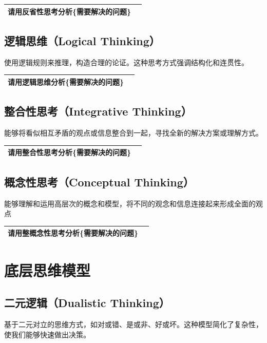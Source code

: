 \documentclass[12pt]{book}
\begin{document}
\begin{tabular}{|p{15cm}|p{3cm}|}
	\hline
请用反省性思考分析\{需要解决的问题\}\\
	\hline
\end{tabular}


\subsection{逻辑思维（Logical Thinking）}
\bigskip
  使用逻辑规则来推理，构造合理的论证。这种思考方式强调结构化和连贯性。

\begin{tabular}{|p{15cm}|p{3cm}|}
	\hline
请用逻辑思维分析\{需要解决的问题\}\\
	\hline
\end{tabular}


\subsection{整合性思考（Integrative Thinking）}
\bigskip
  能够将看似相互矛盾的观点或信息整合到一起，寻找全新的解决方案或理解方式。

\begin{tabular}{|p{15cm}|p{3cm}|}
	\hline
请用整合性思考分析\{需要解决的问题\}\\
	\hline
\end{tabular}



\subsection{概念性思考（Conceptual Thinking）}
\bigskip
  能够理解和运用高层次的概念和模型，将不同的观念和信息连接起来形成全面的观点

\begin{tabular}{|p{15cm}|p{3cm}|}
	\hline
请用整概念性思考分析\{需要解决的问题\}\\
	\hline
\end{tabular}


\section{底层思维模型}
\subsection{二元逻辑（Dualistic Thinking）}
\bigskip
  基于二元对立的思维方式，如对或错、是或非、好或坏。这种模型简化了复杂性，使我们能够快速做出决策。
\end{document}
